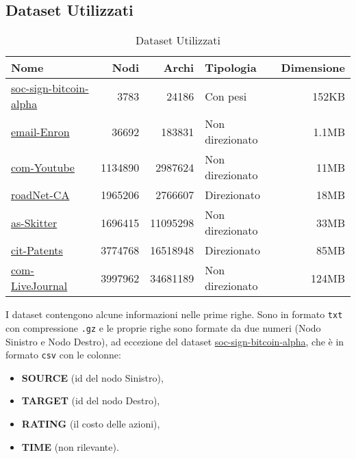 \documentclass{article}
\begin{document}
\subsection{Dataset Utilizzati}
\begin{table}[h]
	\centering
	\begin{tabular}{|l|r|r|l|r|}
		\hline
		Nome                                                                                      & Nodi    & Archi    & Tipologia       & Dimensione \\
		\hline
		\href{https://snap.stanford.edu/data/soc-sign-bitcoin-alpha.html}{soc-sign-bitcoin-alpha} & 3783    & 24186    & Con pesi        & 152KB      \\
		\href{https://snap.stanford.edu/data/email-Enron.html}{email-Enron}                       & 36692   & 183831   & Non direzionato & 1.1MB      \\
		\href{https://snap.stanford.edu/data/com-Youtube.html}{com-Youtube}                       & 1134890 & 2987624  & Non direzionato & 11MB       \\
		\href{https://snap.stanford.edu/data/roadNet-CA.html}{roadNet-CA}                         & 1965206 & 2766607  & Direzionato     & 18MB       \\
		\href{https://snap.stanford.edu/data/as-Skitter.html}{as-Skitter}                         & 1696415 & 11095298 & Non direzionato & 33MB       \\
		\href{https://snap.stanford.edu/data/cit-Patents.html}{cit-Patents}                       & 3774768 & 16518948 & Direzionato     & 85MB       \\
		\href{https://snap.stanford.edu/data/com-LiveJournal.html}{com-LiveJournal}               & 3997962 & 34681189 & Non direzionato & 124MB      \\
		\hline
	\end{tabular}
	\caption{Dataset Utilizzati}
\end{table}

I dataset contengono alcune informazioni nelle prime righe. Sono in formato \texttt{txt}
con compressione \texttt{.gz} e le proprie righe sono formate da due numeri (Nodo Sinistro
e Nodo Destro), ad eccezione del dataset
\href{https://snap.stanford.edu/data/soc-sign-bitcoin-alpha.html}{soc-sign-bitcoin-alpha},
che è in formato \texttt{csv} con le colonne:
\begin{itemize}
	\item \textbf{SOURCE} (id del nodo Sinistro),
	\item \textbf{TARGET} (id del nodo Destro),
	\item \textbf{RATING} (il costo delle azioni),
	\item \textbf{TIME} (non rilevante).
\end{itemize}
\end{document}
